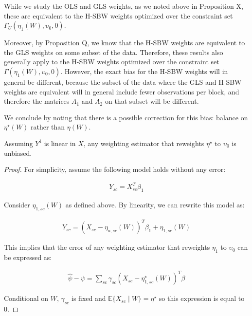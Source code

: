 \begin{remark}
While we study the OLS and GLS weights, as we noted above in Proposition X, these are equivalent to the H-SBW weights optimized over the constraint set $\Gamma_U(\eta_1(W), \upsilon_0, 0)$. 

Moreover, by Proposition Q, we know that the H-SBW weights are equivalent to the GLS weights on some subset of the data. Therefore, these results also generally apply to the H-SBW weights optimized over the constraint set $\Gamma(\eta_1(W), \upsilon_0, 0)$. However, the exact bias for the H-SBW weights will in general be different, because the subset of the data where the GLS and H-SBW weights are equivalent will in general include fewer observations per block, and therefore the matrices $A_1$ and $A_2$ on that subset will be different. 
\end{remark}

We conclude by noting that there is a possible correction for this bias: balance on $\eta^\star(W)$ rather than $\eta(W)$. 

\begin{proposition}
    Assuming $Y^1$ is linear in $X$, any weighting estimator that reweights $\eta^\star$ to $\upsilon_0$ is unbiased.
\end{proposition}

\begin{proof}
    For simplicity, assume the following model holds without any error:
    
    \begin{align*}
        Y_{sc} = X_{sc}^T\beta_1
    \end{align*}
    
    Consider $\eta_{1, sc}(W)$ as defined above. By linearity, we can rewrite this model as:
    
    \begin{align*}
        Y_{sc} = (X_{sc} - \eta_{a, sc}(W))^T\beta_1 + \eta_{1, sc}(W)
    \end{align*}
    
    This implies that the error of any weighting estimator that reweights $\eta_1$ to $\upsilon_0$ can be expressed as:
    
    \begin{align*}
        \hat{\psi} - \psi = \sum_{sc}\gamma_{sc}(X_{sc} - \eta^\star_{1, sc}(W))^T\beta
    \end{align*}
    
    Conditional on $W$, $\gamma_{sc}$ is fixed and $\mathbb{E}\{X_{sc} \mid W\} = \eta^\star$ so this expression is equal to 0.
\end{proof}

